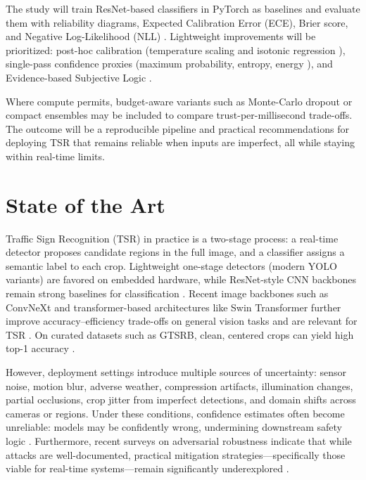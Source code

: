 \documentclass[11pt,a4paper]{article}
\begin{document}
The study will train ResNet-based classifiers \cite{he2016deep} in PyTorch as baselines and evaluate them with reliability diagrams, Expected Calibration Error (ECE), Brier score, and Negative Log-Likelihood (NLL) \cite{guo2017calibration, niculescu2005predicting}. Lightweight improvements will be prioritized: post-hoc calibration (temperature scaling and isotonic regression \cite{guo2017calibration}), single-pass confidence proxies (maximum probability, entropy, energy \cite{liu2020energy}), and Evidence-based Subjective Logic \cite{sensoy2018evidential}.

Where compute permits, budget-aware variants such as Monte-Carlo dropout \cite{gal2016dropout} or compact ensembles \cite{lakshminarayanan2017simple} may be included to compare trust-per-millisecond trade-offs. The outcome will be a reproducible pipeline and practical recommendations for deploying TSR that remains reliable when inputs are imperfect, all while staying within real-time limits.

\section{State of the Art}

Traffic Sign Recognition (TSR) in practice is a two-stage process: a real-time detector proposes candidate regions in the full image, and a classifier assigns a semantic label to each crop. Lightweight one-stage detectors (modern YOLO variants) are favored on embedded hardware, while ResNet-style CNN backbones remain strong baselines for classification \cite{stallkamp2011gtsrb,he2016deep,redmon2018yolov3}. Recent image backbones such as ConvNeXt and transformer-based architectures like Swin Transformer further improve accuracy–efficiency trade-offs on general vision tasks and are relevant for TSR \cite{liu2022convnext,liu2021swin}. On curated datasets such as GTSRB, clean, centered crops can yield high top-1 accuracy \cite{stallkamp2011gtsrb}.

However, deployment settings introduce multiple sources of uncertainty: sensor noise, motion blur, adverse weather, compression artifacts, illumination changes, partial occlusions, crop jitter from imperfect detections, and domain shifts across cameras or regions. Under these conditions, confidence estimates often become unreliable: models may be confidently wrong, undermining downstream safety logic \cite{ovadia2019can,minderer2021revisiting}. Furthermore, recent surveys on adversarial robustness indicate that while attacks are well-documented, practical mitigation strategies—specifically those viable for real-time systems—remain significantly underexplored \cite{pavlitska2023attacks}.
\end{document}
